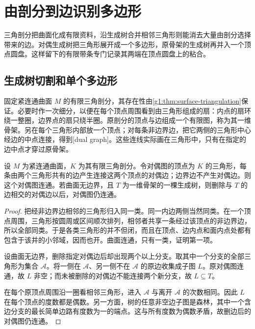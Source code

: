 
% 
% 

\section{由剖分到边识别多边形}
\label{g1:sec:0603}

三角剖分把曲面化成有限资料，沿生成树合并相邻三角形则能消去大量由剖分选择带来的边。对偶生成树把三角形展开成一个多边形，原骨架的生成树再并入一个顶点圆盘。这样留下的有限带条专门记录其两端在顶点圆盘上的粘合。

\subsection{生成树切割和单个多边形}
\label{g1:subsec:0603:01}

固定紧连通曲面 \(M\) 的有限三角剖分，其存在性由\cref{g1:thm:surface-triangulation}保证。必要时作一次细分，以便在每个顶点周围看到由三角形组成的扇：内点的扇环绕一整圈，边界点的扇只绕半圈。原剖分的顶点与边组成一个有限图，称为其一维骨架。另在每个三角形内部放一个顶点；对每条非边界边，把它两侧的三角形中心经边的中点连接，得到[dual graph]。这些连线实际画在三角形中，只有在指定的边中点才穿过原骨架。

\begin{lemma}\label{g1:lem:surface-dual-connected}
	设 \(M\) 为紧连通曲面，\(K\) 为其有限三角剖分。令对偶图的顶点为 \(K\) 的三角形，每条由两个三角形共有的边产生连接这两个顶点的对偶边；边界边不产生对偶边。则这个对偶图连通。若曲面无边界，且 \(T\) 为一维骨架的一棵生成树，则删除与 \(T\) 的边相交的对偶边以后，对偶图仍连通。
\end{lemma}
\begin{proof}
	把经非边界边相邻的三角形归入同一类。同一内边两侧当然同类。在一个顶点周围，三角形按圆周或区间顺次排列，相邻者共享一条经过该顶点的非边界边，所以全部同类。于是各类三角形的并不但闭，而且在顶点、边内点和面内点处都有包含于该并的小邻域，因而也开。曲面连通，只有一类，证明第一项。

	设曲面无边界，删除指定对偶边后却出现两个以上分支。取其中一个分支的全部三角形为集合 \(\mathcal A\)。将一侧在 \(\mathcal A\)、另一侧不在 \(\mathcal A\) 的原边收集成子图 \(L\)。原对偶图连通，故 \(L\) 非空；而未被删除的对偶边不能连接两个新分支，故 \(L\subseteq T\)。

	在每个原顶点周围沿一圈看相邻三角形，进入 \(\mathcal A\) 与离开 \(\mathcal A\) 的次数相同。因此 \(L\) 在每个顶点的度数都是偶数。另一方面，树的任意非空边子图是森林，其中一个含边分支的最长简单边路有度数为一的端点。这与所有度数为偶数矛盾，故删边后的对偶图仍连通。
\end{proof}

